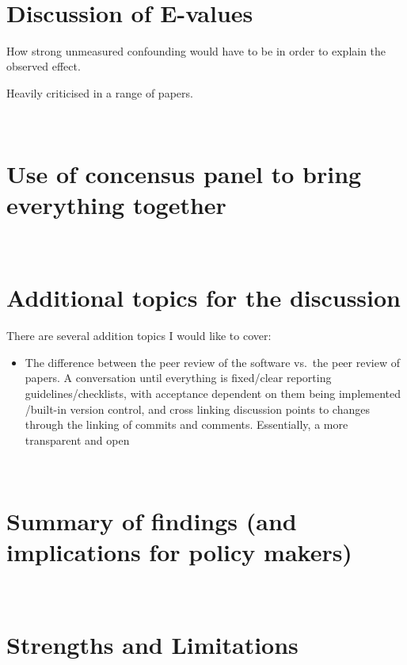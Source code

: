 \documentclass[a4paper, twoside]{templates/ociamthesis}
\providecommand{\tightlist}{%
  \setlength{\itemsep}{0pt}\setlength{\parskip}{0pt}}
\begin{document}
~

\hypertarget{discussion-of-e-values}{%
\section{Discussion of E-values}\label{discussion-of-e-values}}

How strong unmeasured confounding would have to be in order to explain the observed effect.

Heavily criticised in a range of papers.

~

\hypertarget{use-of-concensus-panel-to-bring-everything-together}{%
\section{Use of concensus panel to bring everything together}\label{use-of-concensus-panel-to-bring-everything-together}}

~

\hypertarget{additional-topics-for-the-discussion}{%
\section{Additional topics for the discussion}\label{additional-topics-for-the-discussion}}

There are several addition topics I would like to cover:

\begin{itemize}
\tightlist
\item
  The difference between the peer review of the software vs.~the peer review of papers. A conversation until everything is fixed/clear reporting guidelines/checklists, with acceptance dependent on them being implemented /built-in version control, and cross linking discussion points to changes through the linking of commits and comments. Essentially, a more transparent and open
\end{itemize}

~

\hypertarget{summary-of-findings-and-implications-for-policy-makers}{%
\section{Summary of findings (and implications for policy makers)}\label{summary-of-findings-and-implications-for-policy-makers}}

~

\hypertarget{strengths-and-limitations-2}{%
\section{Strengths and Limitations}\label{strengths-and-limitations-2}}
\end{document}
